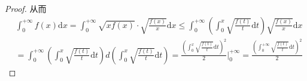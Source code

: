 \documentclass[lang=cn,newtx,10pt,scheme=chinese]{../Template/elegantbook}
\begin{document}
\begin{example}
\begin{proof}
从而
\begin{equation}
\begin{split}
&\int_0^{+\infty}{f\left( x \right) \mathrm{d}x=}\int_0^{+\infty}{\sqrt{xf\left( x \right)}\cdot \sqrt{\frac{f\left( x \right)}{x}}\mathrm{d}x}\leqslant \int_0^{+\infty}{\left( \int_0^x{\sqrt{\frac{f\left( t \right)}{t}}\mathrm{d}t} \right) \sqrt{\frac{f\left( x \right)}{x}}\mathrm{d}x}
\\
&=\int_0^{+\infty}{\left( \int_0^x{\sqrt{\frac{f\left( t \right)}{t}}\mathrm{d}t} \right) d\left( \int_0^x{\sqrt{\frac{f\left( t \right)}{t}}\mathrm{d}t} \right)}=\frac{\left( \int_0^x{\sqrt{\frac{f\left( t \right)}{t}}\mathrm{d}t} \right) ^2}{2}\Bigg|_{0}^{+\infty}=\frac{\left( \int_0^{+\infty}{\sqrt{\frac{f\left( t \right)}{t}}\mathrm{d}t} \right) ^2}{2}
\end{split}
\nonumber
\end{equation}
\end{proof}
\end{example}
\end{document}
